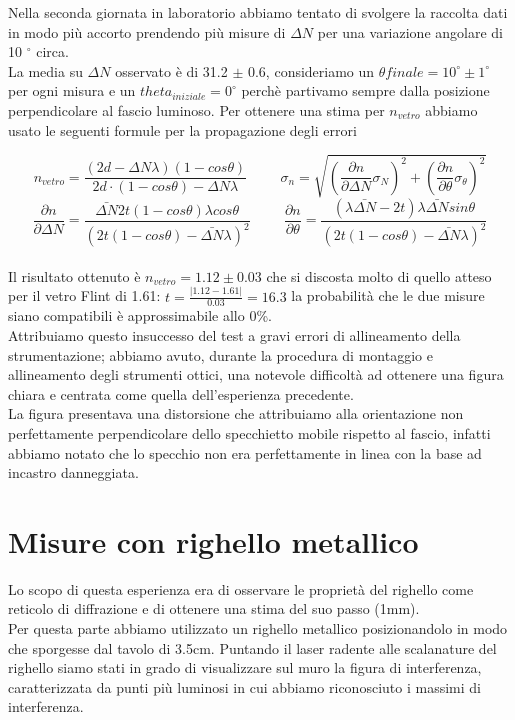 \documentclass{article}
\theoremstyle{definition}
\begin{document}
\noindent Nella seconda giornata in laboratorio abbiamo tentato di svolgere la raccolta dati in modo più accorto prendendo più misure di $\Delta N$ per una variazione angolare di 10 $^{\circ}$ circa.\\
La media su \(\Delta N\) osservato è di 31.2 $\pm$ 0.6, consideriamo un \(\theta finale = 10^{\circ} \pm 1^{\circ}\) per ogni misura e un \(theta_{iniziale} = 0^{\circ}\) perchè partivamo sempre dalla posizione perpendicolare al fascio luminoso.
Per ottenere una stima per \(n_{vetro}\) abbiamo usato le seguenti formule per la propagazione degli errori

\[n_{vetro} =\frac{(2d - \Delta N \lambda)(1 - cos\theta)}{2d \cdot (1 - cos\theta) - \Delta N \lambda} \hspace{1cm} \sigma_{n} = \sqrt{\left( \frac{\partial n}{\partial \Delta N} \sigma_{N}\right)^{2} + \left( \frac{\partial n}{\partial \theta} \sigma_{\theta}\right)^{2}}\]
\[
    \frac{\partial n }{\partial \Delta N}= \frac{\bar{\Delta N}2t(1-cos\theta)\lambda cos\theta}{\left(2t( 1 - cos\theta ) - \bar{\Delta N} \lambda \right)^{2}}
    \hspace{1cm}
    \frac{\partial n }{\partial \theta} = \frac{(\lambda\bar{\Delta N}-2t)\lambda\bar{\Delta N}sin\theta}{\left(2t( 1 - cos\theta ) - \bar{\Delta N}\lambda \right)^{2}}\]\\
    
    
\noindent Il risultato ottenuto è \(n_{vetro} = 1.12 \pm 0.03\) che si discosta molto di quello atteso per il vetro Flint di 1.61: \( t = \frac{\left | 1.12 - 1.61 \right |}{0.03} = 16.3\) la probabilità che le due misure siano compatibili è approssimabile allo 0\%.\\
Attribuiamo questo insuccesso del test a gravi errori di allineamento della strumentazione; abbiamo avuto, durante la procedura di montaggio e allineamento degli strumenti ottici, una notevole difficoltà ad ottenere una figura chiara e centrata come quella dell'esperienza precedente.\\
La figura presentava una distorsione che attribuiamo alla orientazione non perfettamente perpendicolare dello specchietto mobile rispetto al fascio, infatti abbiamo notato che lo specchio non era perfettamente in linea con la base ad incastro danneggiata.

\section{Misure con righello metallico}
Lo scopo di questa esperienza era di osservare le proprietà del righello come reticolo di diffrazione e di ottenere una stima del suo passo (1mm).\\
Per questa parte abbiamo utilizzato un righello metallico posizionandolo in modo che sporgesse dal tavolo di 3.5cm. Puntando il laser radente alle scalanature del righello siamo stati in grado di visualizzare sul muro la figura di interferenza, caratterizzata da punti più luminosi in cui abbiamo riconosciuto i massimi di interferenza.\\
\end{document}
